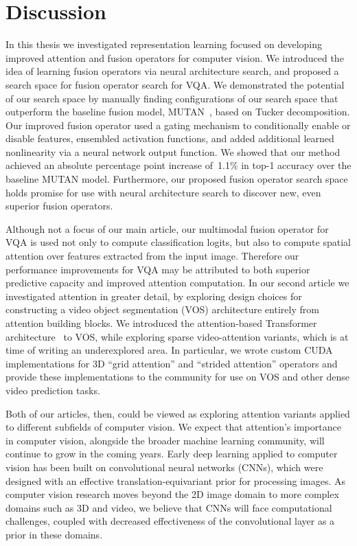 \chapter{Discussion}

In this thesis we investigated representation learning focused on developing
improved attention and fusion operators for computer vision.
We introduced the idea of learning fusion operators via neural architecture
search, and proposed a search space for fusion operator search for VQA\@.
We demonstrated the potential of our search space by manually finding
configurations of our search space that outperform the baseline fusion model,
MUTAN~\citep{ben2017mutan}, based on Tucker decomposition.
Our improved fusion operator used a gating mechanism to conditionally enable or
disable features, ensembled activation functions, and added additional learned
nonlinearity via a neural network output function.
We showed that our method achieved an absolute percentage point increase
of~\num{1.1}\% in top-1 accuracy over the baseline MUTAN model.
Furthermore, our proposed fusion operator search space holds promise for use
with neural architecture search to discover new, even superior fusion
operators.

Although not a focus of our main article, our multimodal fusion operator for
VQA is used not only to compute classification logits, but also to compute
spatial attention over features extracted from the input image.
Therefore our performance improvements for VQA may be attributed to both
superior predictive capacity and improved attention computation.
In our second article we investigated attention in greater detail, by exploring
design choices for constructing a video object segmentation (VOS) architecture
entirely from attention building blocks.
We introduced the attention-based Transformer
architecture~\citep{vaswani2017attention} to VOS, while exploring sparse
video-attention variants, which is at time of writing an underexplored area.
In particular, we wrote custom CUDA implementations for 3D ``grid attention''
and ``strided attention'' operators and provide these implementations to the
community for use on VOS and other dense video prediction tasks.

Both of our articles, then, could be viewed as exploring attention variants
applied to different subfields of computer vision.
We expect that attention's importance in computer vision, alongside the broader
machine learning community, will continue to grow in the coming years.
Early deep learning applied to computer vision has been built on convolutional
neural networks (CNNs), which were designed with an effective
translation-equivariant prior for processing images.
As computer vision research moves beyond the 2D image domain to more complex
domains such as 3D and video, we believe that CNNs will face computational
challenges, coupled with decreased effectiveness of the convolutional layer as
a prior in these domains.

